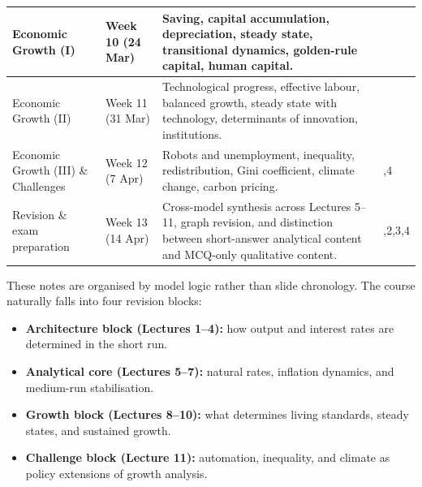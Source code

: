 \documentclass[12pt]{article}
\begin{document}
\begin{center}
\begin{tabularx}{\textwidth}{
|>{\raggedright\arraybackslash}p{3.2cm}
|>{\raggedright\arraybackslash}p{1.6cm}
|>{\raggedright\arraybackslash}X
|>{\raggedright\arraybackslash}p{1.8cm}|
}
\hline
Economic Growth (I) &
Week 10 (24 Mar) &
Saving, capital accumulation, depreciation, steady state, transitional dynamics, golden-rule capital, human capital. &
3 \\
\hline
Economic Growth (II) &
Week 11 (31 Mar) &
Technological progress, effective labour, balanced growth, steady state with technology, determinants of innovation, institutions. &
3 \\
\hline
Economic Growth (III) \& Challenges &
Week 12 (7 Apr) &
Robots and unemployment, inequality, redistribution, Gini coefficient, climate change, carbon pricing. &
3,4 \\
\hline
Revision \& exam preparation &
Week 13 (14 Apr) &
Cross-model synthesis across Lectures 5--11, graph revision, and distinction between short-answer analytical content and MCQ-only qualitative content. &
1,2,3,4 \\
\hline
\end{tabularx}
\end{center}

\noindent
These notes are organised by model logic rather than slide chronology. The course naturally falls into four revision blocks:
\begin{itemize}[leftmargin=1.5em]
\item \textbf{Architecture block (Lectures 1--4):} how output and interest rates are determined in the short run.
\item \textbf{Analytical core (Lectures 5--7):} natural rates, inflation dynamics, and medium-run stabilisation.
\item \textbf{Growth block (Lectures 8--10):} what determines living standards, steady states, and sustained growth.
\item \textbf{Challenge block (Lecture 11):} automation, inequality, and climate as policy extensions of growth analysis.
\end{itemize}
\end{document}
